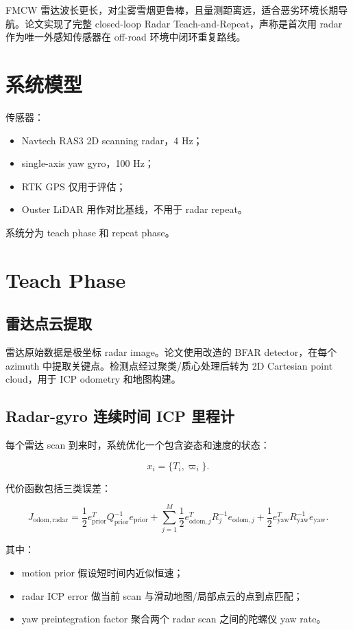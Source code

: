 \documentclass[UTF8,a4paper,12pt]{ctexrep}
\begin{document}
FMCW 雷达波长更长，对尘雾雪烟更鲁棒，且量测距离远，适合恶劣环境长期导航。论文实现了完整 closed-loop Radar Teach-and-Repeat，声称是首次用 radar 作为唯一外感知传感器在 off-road 环境中闭环重复路线。

\section{系统模型}

传感器：

\begin{itemize}
  \item Navtech RAS3 2D scanning radar，4 Hz；
  \item single-axis yaw gyro，100 Hz；
  \item RTK GPS 仅用于评估；
  \item Ouster LiDAR 用作对比基线，不用于 radar repeat。
\end{itemize}

系统分为 teach phase 和 repeat phase。

\section{Teach Phase}

\subsection{雷达点云提取}

雷达原始数据是极坐标 radar image。论文使用改造的 BFAR detector，在每个 azimuth 中提取关键点。检测点经过聚类/质心处理后转为 2D Cartesian point cloud，用于 ICP odometry 和地图构建。

\subsection{Radar-gyro 连续时间 ICP 里程计}

每个雷达 scan 到来时，系统优化一个包含姿态和速度的状态：

\[
x_i=\{T_i,\varpi_i\}.
\]

代价函数包括三类误差：

\[
J_{\mathrm{odom,radar}}
=
\frac{1}{2}e_{\mathrm{prior}}^TQ_{\mathrm{prior}}^{-1}e_{\mathrm{prior}}
+
\sum_{j=1}^{M}\frac{1}{2}e_{\mathrm{odom},j}^TR_j^{-1}e_{\mathrm{odom},j}
+
\frac{1}{2}e_{\mathrm{yaw}}^TR_{\mathrm{yaw}}^{-1}e_{\mathrm{yaw}}.
\]

其中：

\begin{itemize}
  \item motion prior 假设短时间内近似恒速；
  \item radar ICP error 做当前 scan 与滑动地图/局部点云的点到点匹配；
  \item yaw preintegration factor 聚合两个 radar scan 之间的陀螺仪 yaw rate。
\end{itemize}
\end{document}
